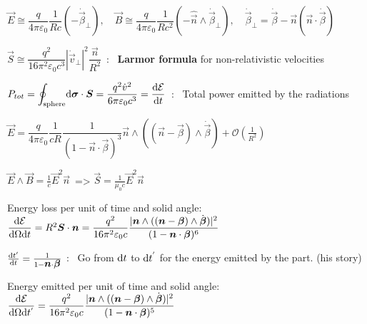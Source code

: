 \squishlist
\item $\vec{E} \cong \dfrac{q}{4\pi\varepsilon_0} \dfrac{1}{Rc} (-\dot{\vec{\beta}}_\perp), \quad \vec{B} \cong \dfrac{q}{4\pi\varepsilon_0} \dfrac{1}{Rc^2} (-\hat{\vec{n}}\wedge \dot{\vec{\beta}}_\perp) , \quad \dot{\vec{\beta}}_{\perp} = \dot{\vec{\beta}} - \vec{n}(\vec{n}\cdot\dot{\vec{\beta}}) $\\

\item $\vec{S} \cong \dfrac{q^2}{16 \pi^2 \varepsilon_0 c^3} |\dot{\vec{v}}_\perp|^2 \dfrac{\vec{n}}{R^2} \,$ : \, \textbf{Larmor formula} for non-relativistic velocities

\item $P_{tot} = \displaystyle{\oint_{\text{sphere}}} \mbox{\boldmath$\textrm{d} \sigma$}\cdot \mbox{\boldmath$S$} = \dfrac{q^2 \dot{v}^2}{6\pi\varepsilon_0 c^3}=\frac{\textrm{d} \mathcal{E}}{\textrm{d} t} \, $ : \, Total power emitted by the radiations
\squishend
{}
\squishlist
\item $\vec{E} = \dfrac{q}{4\pi\varepsilon_0}\dfrac{1}{cR}\dfrac{1}{(1-\vec{n}\cdot\vec{\beta})^3} \vec{n} \wedge ((\vec{n} - \vec{\beta}) \wedge \dot{\vec{\beta}}) + \mathcal{O}\left(\frac{1}{R^2}\right)$

\item $\vec{E} \wedge \vec{B} = \frac{1}{c} \vec{E}^2 \vec{n} \, $ => $\vec{S} = \frac{1}{\mu_0 c} \vec{E}^2\vec{n}$

\item Energy loss per unit of time and solid angle: $\dfrac{\textrm{d} \mathcal{E}}{\textrm{d} \Omega \textrm{d} t} = R^2\mbox{\boldmath$S$}\cdot\mbox{\boldmath$n$} = \dfrac{q^2}{16\pi^2 \varepsilon_0 c} \dfrac{|\mbox{\boldmath$n$}\wedge ((\mbox{\boldmath$n$}-\mbox{\boldmath$\beta$}) \wedge \dot{\mbox{\boldmath$\beta$}})|^2}{(1-\mbox{\boldmath$n$}\cdot\mbox{\boldmath$\beta$})^6}$

\item $\frac{\textrm{d} t'}{\textrm{d} t} = \frac{1}{1-\mbox{\boldmath$n$}\cdot\mbox{\boldmath$\beta$}}$ : \  Go from $\textrm{d} t$ to $\textrm{d} t^{'}$ for the energy emitted by the part. (his story)  
\\
\item Energy emitted per unit of time and solid angle:
$\dfrac{\textrm{d} \mathcal{E}}{\textrm{d} \Omega \textrm{d} t^{'}} = \dfrac{q^2}{16\pi^2 \varepsilon_0 c} \dfrac{|\mbox{\boldmath$n$}\wedge ((\mbox{\boldmath$n$}-\mbox{\boldmath$\beta$}) \wedge \dot{\mbox{\boldmath$\beta$}})|^2}{(1-\mbox{\boldmath$n$}\cdot\mbox{\boldmath$\beta$})^5}$

\squishend


